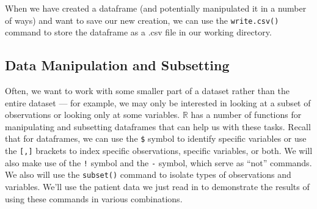 \documentclass[12pt]{article}
\begin{document}
When we have created a dataframe (and potentially manipulated it in a number of ways) and want to save our new creation, we can use the \verb|write.csv()| command to store the dataframe as a .csv file in our working directory.

\subsection{Data Manipulation and Subsetting}
Often, we want to work with some smaller part of a dataset rather than the entire dataset --- for example, we may only be interested in looking at a subset of observations or looking only at some variables. $\mathbb{R}$ has a number of functions for manipulating and subsetting dataframes that can help us with these tasks. Recall that for dataframes, we can use the \verb|$| symbol to identify specific variables or use the \verb|[,]| brackets to index specific observations, specific variables, or both. We will also make use of the \verb|!| symbol and the \verb|-| symbol, which serve as ``not'' commands. We also will use the \verb|subset()| command to isolate types of observations and variables. We'll use the patient data we just read in to demonstrate the results of using these commands in various combinations.
\end{document}
